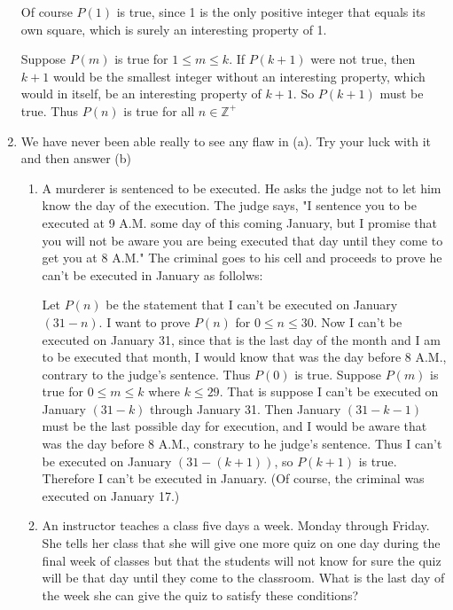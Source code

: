 \documentclass[10pt,letterpaper]{article}
\begin{document}
\begin{enumerate}
  Of course $P(1)$ is true, since 1 is the only positive integer that equals its own square, which is surely an interesting property of 1.
  
  Suppose $P(m)$ is true for $1 \le m \le k$. If $P(k+1)$ were not true, then $k+1$ would be the smallest integer without an interesting property, 
  which would in itself, be an interesting property of $k+1$. So $P(k+1)$ must be true. Thus $P(n)$ is true for all $n \in \mathbb{Z}^+$
  
  \item We have never been able really to see any flaw in (a). Try your luck with it and then answer (b)
  \begin{enumerate}
    \item A murderer is sentenced to be executed. He asks the judge not to let him know the day of the execution. 
    The judge says, "I sentence you to be executed at 9 A.M. some day of this coming January, but I promise that you will not be aware you are being executed that day until they come to  get you at 8 A.M." 
    The criminal goes to his cell and proceeds to prove he can't be executed in January as follolws:
  
    Let $P(n)$ be the statement that I can't be executed on  January $(31-n)$. I want to prove $P(n)$ for $0 \le n \le 30$. Now I can't be executed on January 31, since that is the last day of the month and I am to be executed that month, I would know that was the day before 8 A.M., contrary to the judge's sentence. Thus $P(0)$ is true. Suppose $P(m)$ is true for $0 \le m \le k$ where $k \le 29$. That is suppose I can't be executed on January $(31-k)$ through January 31. Then January $(31 - k -1)$ must be the last possible day for execution, and I would be  aware that was the day before 8 A.M., constrary to he judge's sentence. Thus I can't be executed on January $(31 - (k+1))$, so $P(k+1)$ is true. Therefore I can't be executed in January.
    (Of course, the criminal was executed on January 17.)
    
    \item An instructor teaches a class five days a week. Monday through Friday. She tells her class that she will give one more quiz on one day during the final week of classes but that the students will not know for sure the quiz will be that day until they come to the classroom. What is the last day of the week she can give the quiz to satisfy these conditions? 
  \end{enumerate}
  
  \end{enumerate}
\end{document}
